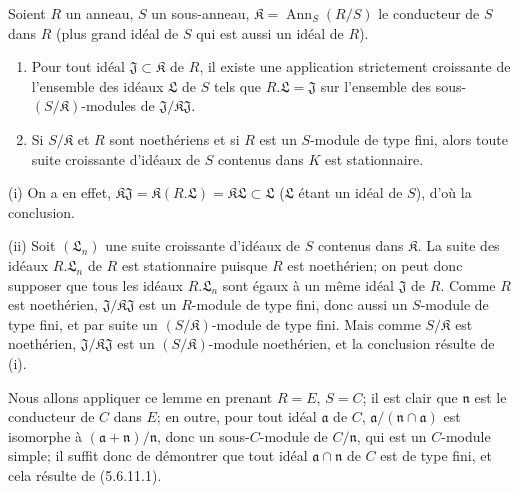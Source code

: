 \begin{example}[5.6.11]
\begin{lemma}[5.6.11.1]
Soient $R$ un anneau, $S$ un sous-anneau,
$\mathfrak K=\operatorname{Ann}_S(R/S)$ le conducteur de $S$ dans $R$
(plus grand idéal de $S$ qui est aussi un idéal de $R$).
\begin{enumerate}
\item[\textup{(i)}] Pour tout idéal $\mathfrak J\subset\mathfrak K$ de $R$, il existe
une application strictement croissante de l'ensemble des idéaux
$\mathfrak L$ de $S$ tels que $R.\mathfrak L=\mathfrak J$ sur l'ensemble des
sous-$(S/\mathfrak K)$-modules de
$\mathfrak J/\mathfrak K\mathfrak J$.
\item[\textup{(ii)}] Si $S/\mathfrak K$ et $R$ sont noethériens et si $R$ est un
$S$-module de type fini, alors toute suite croissante d'idéaux de $S$
contenus dans $K$ est stationnaire.
\end{enumerate}
\end{lemma}

(i) On a en effet,
$\mathfrak K\mathfrak J=\mathfrak K(R.\mathfrak L)
=\mathfrak K\mathfrak L\subset\mathfrak L$
($\mathfrak L$ étant un idéal de $S$), d'où la conclusion.

(ii) Soit $(\mathfrak L_n)$ une suite croissante d'idéaux de $S$ contenus
dans $\mathfrak K$. La suite des idéaux $R.\mathfrak L_n$ de $R$ est
stationnaire puisque $R$ est noethérien; on peut donc supposer que tous les
idéaux $R.\mathfrak L_n$ sont égaux à un même idéal $\mathfrak J$ de $R$.
Comme $R$ est noethérien, $\mathfrak J/\mathfrak K\mathfrak J$ est un
$R$-module de type fini, donc aussi un $S$-module de type fini, et par suite
un $(S/\mathfrak K)$-module de type fini. Mais comme $S/\mathfrak K$ est
noethérien, $\mathfrak J/\mathfrak K\mathfrak J$ est un
$(S/\mathfrak K)$-module noethérien, et la conclusion résulte de (i).

Nous allons appliquer ce lemme en prenant $R=E$, $S=C$; il est clair que
$\mathfrak n$ est le conducteur de $C$ dans $E$; en outre, pour tout idéal
$\mathfrak a$ de $C$,
$\mathfrak a/(\mathfrak n\cap\mathfrak a)$ est isomorphe à
$(\mathfrak a+\mathfrak n)/\mathfrak n$, donc un sous-$C$-module de
$C/\mathfrak n$, qui est un $C$-module simple; il suffit donc de démontrer
que tout idéal $\mathfrak a\cap\mathfrak n$ de $C$ est de type fini, et cela
résulte de (5.6.11.1).


\end{example}
